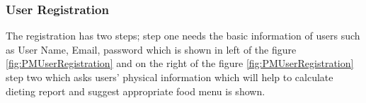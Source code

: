\subsubsection{User Registration}
\label{UserRegistration}
The registration has two steps; step one needs the basic information of users
such as User Name, Email, password which is shown in left of the figure
\ref{fig:PMUserRegistration} and on the right of the figure
\ref{fig:PMUserRegistration} step two which asks users' physical
information which will help to calculate dieting report and suggest appropriate
food menu is shown.
\begin{figure}[h]
\centering
\end{figure}
